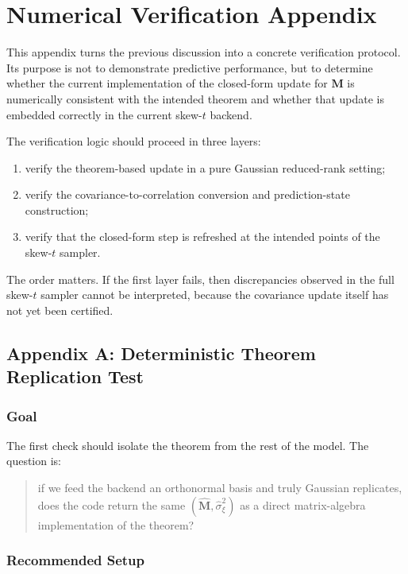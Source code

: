 \documentclass[11pt]{article}
\newcommand{\bM}{\mathbf{M}}
\begin{document}
\appendix

\section{Numerical Verification Appendix}

This appendix turns the previous discussion into a concrete verification
protocol. Its purpose is not to demonstrate predictive performance, but to
determine whether the current implementation of the closed-form update for
\(\bM\) is numerically consistent with the intended theorem and whether that
update is embedded correctly in the current skew-$t$ backend.

The verification logic should proceed in three layers:

\begin{enumerate}[label=\arabic*.]
\item verify the theorem-based update in a pure Gaussian reduced-rank setting;
\item verify the covariance-to-correlation conversion and prediction-state
construction;
\item verify that the closed-form step is refreshed at the intended points of
the skew-$t$ sampler.
\end{enumerate}

The order matters. If the first layer fails, then discrepancies observed in the
full skew-$t$ sampler cannot be interpreted, because the covariance update
itself has not yet been certified.

\subsection{Appendix A: Deterministic Theorem Replication Test}

\subsubsection{Goal}

The first check should isolate the theorem from the rest of the model. The
question is:

\begin{quote}
if we feed the backend an orthonormal basis and truly Gaussian replicates, does
the code return the same \((\widehat{\bM}, \widehat{\sigma}_\xi^2)\) as a direct
matrix-algebra implementation of the theorem?
\end{quote}

\subsubsection{Recommended Setup}
\end{document}
